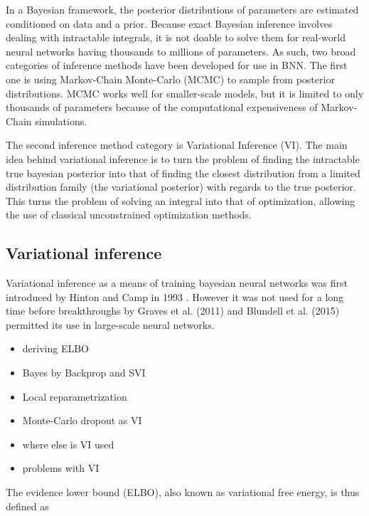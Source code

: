 	In a Bayesian framework, the posterior distributions of parameters are estimated conditioned on data and a prior. Because exact Bayesian inference involves dealing with intractable integrals, it is not doable to solve them for real-world neural networks having thousands to millions of parameters. As such, two broad categories of inference methods have been developed for use in BNN. The first one is using Markov-Chain Monte-Carlo (MCMC) to sample from posterior distributions. MCMC works well for smaller-scale models, but it is limited to only thousands of parameters because of the computational expensiveness of Markov-Chain simulations. 
	
	The second inference method category is Variational Inference (VI). The main idea behind variational inference is to turn the problem of finding the intractable true bayesian posterior into that of finding the closest distribution from a limited distribution family (the variational posterior) with regards to the true posterior. This turns the problem of solving an integral into that of optimization, allowing the use of classical unconstrained optimization methods. 
	
	

\subsection{Variational inference}
\label{section:vi}


	Variational inference as a means of training bayesian neural networks was first introduced by Hinton and Camp in 1993 \cite{hinton_keeping_1993}. However it was not used for a long time before breakthroughs by Graves et al. (2011) \cite{graves_practical_2011} and Blundell et al. (2015) \cite{blundell_weight_2015} permitted its use in large-scale neural networks. 
	
	 

	\begin{itemize}
		\item deriving ELBO
		
		
		\item Bayes by Backprop and SVI
		\item Local reparametrization
		\item Monte-Carlo dropout as VI
		\item where else is VI used
		\item problems with VI
	\end{itemize}

	The evidence lower bound (ELBO), also known as variational free energy, is thus defined as 
	
